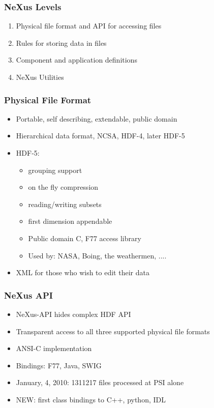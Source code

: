 \documentclass{beamer}
\begin{document}
\begin{frame}
 \frametitle{NeXus Levels }
\begin{enumerate}
\item Physical file format and API for accessing files
\item Rules for storing data in files
\item Component and application definitions
\item NeXus Utilities
\end{enumerate}
\end{frame}

\begin{frame} \frametitle{Physical File Format }
\begin{itemize}
\item Portable, self describing, extendable, public domain
\item Hierarchical data format, NCSA, HDF-4, later HDF-5
\item HDF-5:
\begin{itemize}
\item grouping support
\item on the fly compression
\item reading/writing subsets
\item first dimension appendable
\item Public domain C, F77 access library
\item Used by: NASA, Boing, the weathermen, .... 
\end{itemize}
\item XML for those who wish to edit their data
\end{itemize}
\end{frame}


\begin{frame} \frametitle{NeXus API }
\begin{itemize}
\item NeXus-API hides complex HDF API
\item Transparent access to all three supported physical file formats
\item ANSI-C implementation
\item Bindings: F77, Java, SWIG
\item January, 4, 2010: 1311217 files processed at PSI alone
\item {\color{red}NEW}: first class bindings to C++, python, IDL
\end{itemize}
\end{frame}
\end{document}
